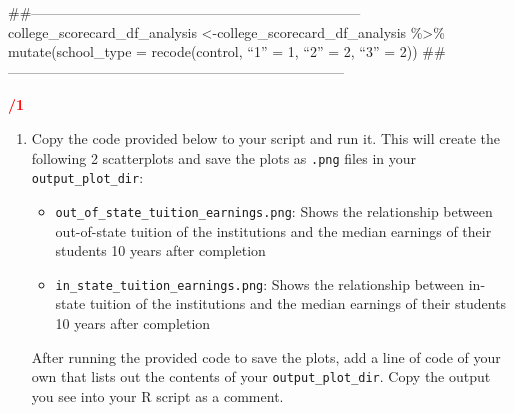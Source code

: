 \documentclass[
]{article}
\providecommand{\tightlist}{%
  \setlength{\itemsep}{0pt}\setlength{\parskip}{0pt}}
\begin{document}
\#\#-----------------------------------------------------------------------
college\_scorecard\_df\_analysis
\textless-college\_scorecard\_df\_analysis \%\textgreater\%
mutate(school\_type = recode(control, ``1'' = 1, ``2'' = 2, ``3'' = 2))
\#\#------------------------------------------------------------------------

\textcolor{red}{\textbf{/1}}

\begin{enumerate}
\def\labelenumi{\arabic{enumi}.}
\setcounter{enumi}{3}
\item
  Copy the code provided below to your script and run it. This will
  create the following 2 scatterplots and save the plots as
  \texttt{.png} files in your \texttt{output\_plot\_dir}:

  \begin{itemize}
  \tightlist
  \item
    \texttt{out\_of\_state\_tuition\_earnings.png}: Shows the
    relationship between out-of-state tuition of the institutions and
    the median earnings of their students 10 years after completion
  \item
    \texttt{in\_state\_tuition\_earnings.png}: Shows the relationship
    between in-state tuition of the institutions and the median earnings
    of their students 10 years after completion
  \end{itemize}

  After running the provided code to save the plots, add a line of code
  of your own that lists out the contents of your
  \texttt{output\_plot\_dir}. Copy the output you see into your R script
  as a comment.
\end{enumerate}
\end{document}
